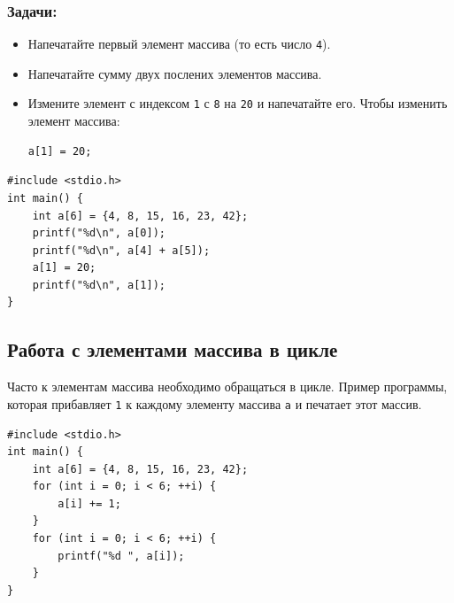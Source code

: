 \documentclass{article}
\begin{document}
\subsubsection*{Задачи:}
\begin{itemize}
\item Напечатайте первый элемент массива (то есть число \texttt{4}).
\item Напечатайте сумму двух послених элементов массива.
\item Измените элемент с индексом \texttt{1} с \texttt{8} на \texttt{20} и напечатайте его. Чтобы изменить элемент массива:
\begin{lstlisting}
a[1] = 20;
\end{lstlisting}
\end{itemize}
\begin{lstlisting}[backgroundcolor = \color{solcolor}]
#include <stdio.h>
int main() {
	int a[6] = {4, 8, 15, 16, 23, 42};
	printf("%d\n", a[0]);
	printf("%d\n", a[4] + a[5]);
	a[1] = 20;
	printf("%d\n", a[1]);
}
\end{lstlisting}

\subsection*{Работа с элементами массива в цикле}
Часто к элементам массива необходимо обращаться в цикле. Пример программы, которая прибавляет \texttt{1} к каждому элементу массива \texttt{a} и печатает этот массив.
\begin{lstlisting}
#include <stdio.h>
int main() {
    int a[6] = {4, 8, 15, 16, 23, 42};
    for (int i = 0; i < 6; ++i) {
        a[i] += 1;
    }
    for (int i = 0; i < 6; ++i) {
        printf("%d ", a[i]);
    }
}
\end{lstlisting}
\end{document}
